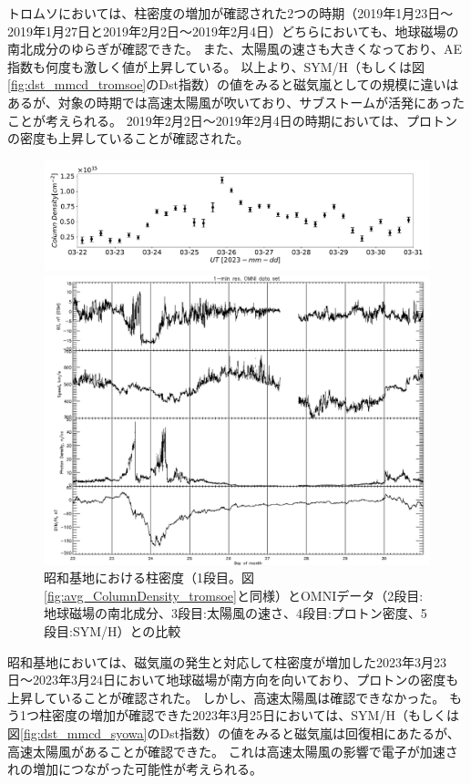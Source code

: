 トロムソにおいては、柱密度の増加が確認された2つの時期（2019年1月23日〜2019年1月27日と2019年2月2日〜2019年2月4日）どちらにおいても、地球磁場の南北成分のゆらぎが確認できた。
また、太陽風の速さも大きくなっており、AE指数も何度も激しく値が上昇している。
以上より、SYM/H（もしくは図\ref{fig:dst_mmcd_tromsoe}のDst指数）の値をみると磁気嵐としての規模に違いはあるが、対象の時期では高速太陽風が吹いており、サブストームが活発にあったことが考えられる。
2019年2月2日〜2019年2月4日の時期においては、プロトンの密度も上昇していることが確認された。\par
\begin{figure}[htbp]
    \centering
    \begin{minipage}{\linewidth}
        \centering
        \includegraphics[width=\linewidth]{master_thesis_contents/master_thesis_fig/column_density_spectr6_syowa.pdf}
    \end{minipage}
    \begin{minipage}{0.96\linewidth}
        \centering
        \includegraphics[width=\linewidth]{master_thesis_contents/master_thesis_fig/omni_syowa.pdf}
    \end{minipage}
    \caption{昭和基地における柱密度（1段目。図\ref{fig:avg_ColumnDensity_tromsoe}と同様）とOMNIデータ（2段目:地球磁場の南北成分、3段目:太陽風の速さ、4段目:プロトン密度、5段目:SYM/H）との比較}
    \label{fig:omni_mmcd_syowa}
\end{figure}

昭和基地においては、磁気嵐の発生と対応して柱密度が増加した2023年3月23日〜2023年3月24日において地球磁場が南方向を向いており、プロトンの密度も上昇していることが確認された。
しかし、高速太陽風は確認できなかった。
もう1つ柱密度の増加が確認できた2023年3月25日においては、SYM/H（もしくは図\ref{fig:dst_mmcd_syowa}のDst指数）の値をみると磁気嵐は回復相にあたるが、高速太陽風があることが確認できた。
これは高速太陽風の影響で電子が加速されの増加につながった可能性が考えられる。
